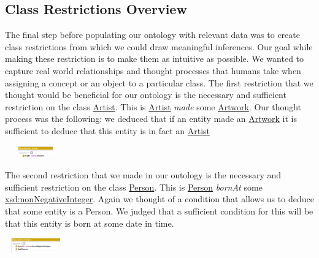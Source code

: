 \documentclass{article}
\begin{document}
\subsection{Class Restrictions Overview} 
The final step before populating our ontology with relevant data was to create class restrictions from which we could draw meaningful inferences. Our goal while making these restriction is to make them as intuitive as possible. We wanted to capture real world relationships and thought processes that humans take when assigning a concept  or an object to a particular class.
\newline
\newline
The first restriction that we thought would be beneficial for our ontology is the necessary and sufficient restriction on the class \underline{Artist}. This is \underline{Artist} \textit{made} some
\underline{Artwork}. Our thought process was the following: we deduced that if an entity made an \underline{Artwork} it is sufficient to deduce that this entity is in fact an \underline{Artist}
\begin{center}
\includegraphics[height=20, width=100]{first_restriction.png}
\end{center}
\newline
\newline
The second restriction that we made in our ontology is the necessary and sufficient restriction on the class
\underline{Person}. This is \underline{Person} \textit{bornAt} some
\underline{xsd:nonNegativeInteger}. Again we thought of a condition that allows us to deduce that some entity  is a Person. We judged that a sufficient condition for this will be that this entity is born at some date in time. 
\begin{center}
\includegraphics[height=25, width=100]{second_restriction.png}
\end{center}
\end{document}
